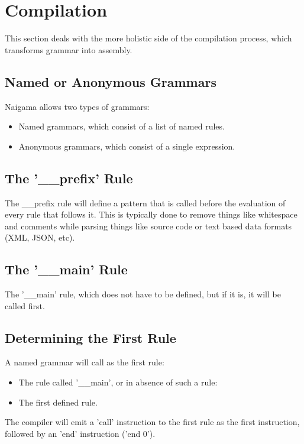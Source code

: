 \section{Compilation}

This section deals with the more holistic side of the compilation process,
which transforms grammar into assembly.

\subsection{Named or Anonymous Grammars}

Naigama allows two types of grammars:

\begin{itemize}
\item Named grammars, which consist of a list of named rules.
\item Anonymous grammars, which consist of a single expression.
\end{itemize}

\subsection{The '\_\_prefix' Rule}

The \_\_prefix rule will define a pattern that is called before
the evaluation of every rule that follows it. This is typically
done to remove things like whitespace and comments while parsing
things like source code or text based data formats (XML, JSON, etc).

\subsection{The '\_\_main' Rule}

The '\_\_main' rule, which does not have to be defined, but if it is,
it will be called first.

\subsection{Determining the First Rule}

A named grammar will call as the first rule:

\begin{itemize}
\item The rule called '\_\_main', or in absence of such a rule:
\item The first defined rule.
\end{itemize}

The compiler will emit a 'call' instruction to the first rule as the
first instruction, followed by an 'end' instruction ('end 0').
